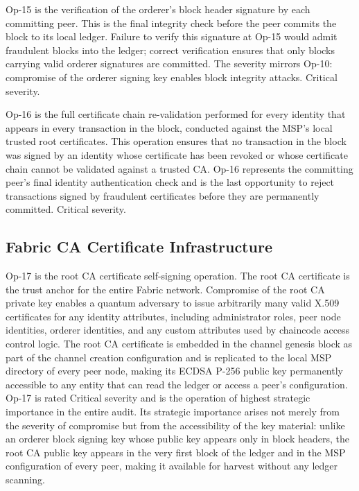 \documentclass[conference]{IEEEtran}
\begin{document}
Op-15 is the verification of the orderer's block header signature by
each committing peer. This is the final integrity check before the peer
commits the block to its local ledger. Failure to verify this signature
at Op-15 would admit fraudulent blocks into the ledger; correct
verification ensures that only blocks carrying valid orderer signatures
are committed. The severity mirrors Op-10: compromise of the orderer
signing key enables block integrity attacks. Critical severity.

Op-16 is the full certificate chain re-validation performed for every
identity that appears in every transaction in the block, conducted
against the MSP's local trusted root certificates. This operation
ensures that no transaction in the block was signed by an identity
whose certificate has been revoked or whose certificate chain cannot
be validated against a trusted CA. Op-16 represents the committing
peer's final identity authentication check and is the last opportunity
to reject transactions signed by fraudulent certificates before they
are permanently committed. Critical severity.

\subsection{Fabric CA Certificate Infrastructure}

Op-17 is the root CA certificate self-signing operation. The root CA
certificate is the trust anchor for the entire Fabric network. Compromise
of the root CA private key enables a quantum adversary to issue arbitrarily
many valid X.509 certificates for any identity attributes, including
administrator roles, peer node identities, orderer identities, and any
custom attributes used by chaincode access control logic. The root CA
certificate is embedded in the channel genesis block as part of the channel
creation configuration and is replicated to the local MSP directory of
every peer node, making its ECDSA P-256 public key permanently accessible
to any entity that can read the ledger or access a peer's configuration.
Op-17 is rated Critical severity and is the operation of highest strategic
importance in the entire audit. Its strategic importance arises not merely
from the severity of compromise but from the accessibility of the key
material: unlike an orderer block signing key whose public key appears
only in block headers, the root CA public key appears in the very first
block of the ledger and in the MSP configuration of every peer, making
it available for harvest without any ledger scanning.
\end{document}
